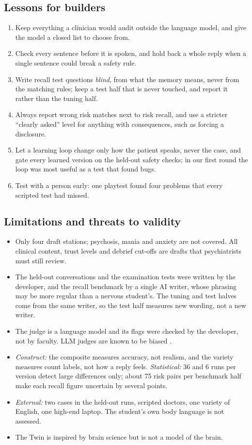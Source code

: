 \documentclass[journal]{IEEEtran}
\begin{document}
\subsection{Lessons for builders}
\begin{enumerate}
\item Keep everything a clinician would audit outside the language model, and give the model a closed list to choose from.
\item Check every sentence before it is spoken, and hold back a whole reply when a single sentence could break a safety rule.
\item Write recall test questions \emph{blind}, from what the memory means, never from the matching rules; keep a test half that is never
touched, and report it rather than the tuning half.
\item Always report wrong risk matches next to risk recall, and use a stricter ``clearly asked'' level for anything with consequences, such as
forcing a disclosure.
\item Let a learning loop change only how the patient speaks, never the case, and gate every learned version on the held-out safety checks; in
our first round the loop was most useful as a test that found bugs.
\item Test with a person early: one playtest found four problems that every scripted test had missed.
\end{enumerate}

\subsection{Limitations and threats to validity}
\begin{itemize}
\item Only four draft stations; psychosis, mania and anxiety are not covered. All clinical content, trust levels and debrief cut-offs are drafts
that psychiatrists must still review.
\item The held-out conversations and the examination tests were written by the developer, and the recall benchmark by a single AI writer, whose
phrasing may be more regular than a nervous student's. The tuning and test halves come from the same writer, so the test half measures new
wording, not a new writer.
\item The judge is a language model and its flags were checked by the developer, not by faculty. LLM judges are known to be biased
\cite{zheng2023judging}.
\item \emph{Construct:} the composite measures accuracy, not realism, and the variety measures count labels, not how a reply feels.
\emph{Statistical:} 36 and 6 runs per version detect large differences only; about 75 risk pairs per benchmark half make each recall figure
uncertain by several points.
\item \emph{External:} two cases in the held-out runs, scripted doctors, one variety of English, one high-end laptop. The student's own body
language is not assessed.
\item The Twin is inspired by brain science but is not a model of the brain.
\end{itemize}
\end{document}
